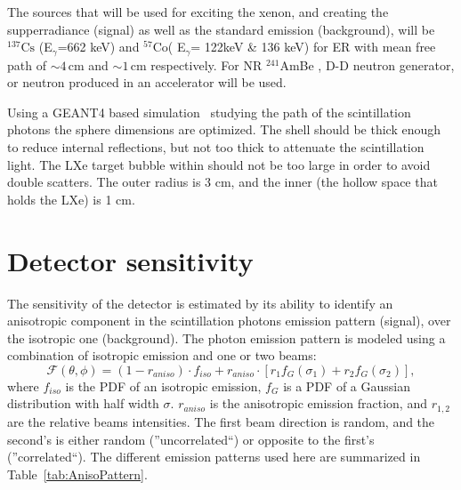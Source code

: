 The sources that will be used for exciting the xenon, and creating the supperradiance (signal) as well as the standard emission (background), will be $^{137} \mathrm{Cs}$ 
(E$_\gamma$=662 keV) and $^{57} \mathrm{Co}$( E$_\gamma$= 122keV \& 136 keV) for ER with mean free path of $\sim4$\,cm and $\sim1$\,cm respectively. For NR $^{241}$AmBe , D-D neutron generator, or neutron produced in an accelerator will be used. 

Using a GEANT4 based simulation~\cite{AGOSTINELLI2003250} studying the path of the scintillation photons the sphere dimensions are optimized. The shell should be thick enough to reduce internal reflections, but not 
too thick to attenuate the scintillation light. The LXe target bubble within should not be too large in order to avoid double scatters. The outer radius  is 3 cm, and the inner (the hollow space that holds the LXe) is 1 cm. 

\FloatBarrier
\section{Detector sensitivity}
\label{sec:sim}
The sensitivity of the detector is estimated by its ability to identify an anisotropic component in the scintillation photons emission pattern (signal), over the isotropic one (background). The photon emission pattern is modeled using a combination of isotropic emission and one or two beams:
\begin{equation}
\mathcal{F}(\theta,\phi) = (1-r_{aniso}) \cdot f_{iso} + r_{aniso}\cdot\left[r_1 f_G(\sigma_1) + r_2 f_G(\sigma_2) \right], 
\end{equation}  
where  $f_{iso}$ is the PDF of an isotropic emission, $f_G$ is a PDF of a Gaussian distribution with half width $\sigma$. $r_{aniso}$ is the anisotropic emission fraction, and $r_{1,2}$ are the relative beams intensities. The first beam direction is random, and the second's is either random 
(''uncorrelated``) or opposite to the first's (''correlated``). The different emission patterns used here are summarized in Table~\ref{tab:AnisoPattern}.
 
